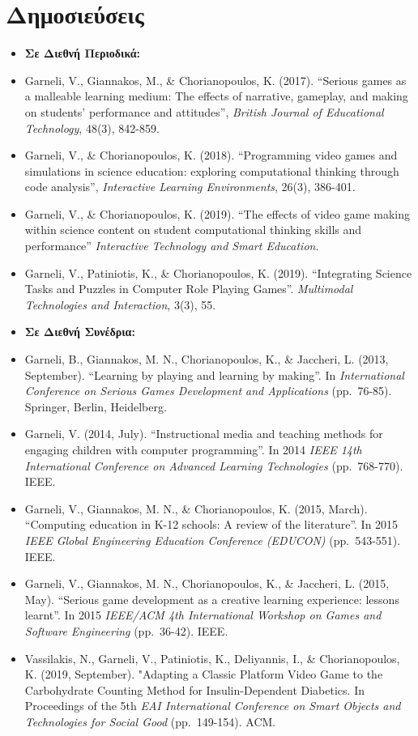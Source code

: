 \documentclass[%
    11pt,
  oneside
  ]{memoir}
\let\oldsection\section
\renewcommand{\section}[1]{%
  \oldsection{#1}
  \leavevmode
  \par
  \vspace{\dimexpr-\baselineskip-\parskip}
}
\begin{document}
\hypertarget{ux3b4ux3b7ux3bcux3bfux3c3ux3b9ux3b5ux3cdux3c3ux3b5ux3b9ux3c2}{%
\section{Δημοσιεύσεις}\label{ux3b4ux3b7ux3bcux3bfux3c3ux3b9ux3b5ux3cdux3c3ux3b5ux3b9ux3c2}}

\begin{itemize}
\tightlist
\item
  \textbf{Σε Διεθνή Περιοδικά:}
\item
  Garneli, V., Giannakos, M., \& Chorianopoulos, K. (2017). ``Serious
  games as a malleable learning medium: The effects of narrative,
  gameplay, and making on students' performance and attitudes'',
  \emph{British Journal of Educational Technology}, 48(3), 842-859.
\item
  Garneli, V., \& Chorianopoulos, K. (2018). ``Programming video games
  and simulations in science education: exploring computational thinking
  through code analysis'', \emph{Interactive Learning Environments},
  26(3), 386-401.
\item
  Garneli, V., \& Chorianopoulos, K. (2019). ``The effects of video game
  making within science content on student computational thinking skills
  and performance'' \emph{Interactive Technology and Smart Education}.
\item
  Garneli, V., Patiniotis, K., \& Chorianopoulos, K. (2019).
  ``Integrating Science Tasks and Puzzles in Computer Role Playing
  Games''. \emph{Multimodal Technologies and Interaction}, 3(3), 55.
\item
  \textbf{Σε Διεθνή Συνέδρια:}
\item
  Garneli, B., Giannakos, M. N., Chorianopoulos, K., \& Jaccheri, L.
  (2013, September). ``Learning by playing and learning by making''. In
  \emph{International Conference on Serious Games Development and
  Applications} (pp.~76-85). Springer, Berlin, Heidelberg.
\item
  Garneli, V. (2014, July). ``Instructional media and teaching methods
  for engaging children with computer programming''. In 2014 \emph{IEEE
  14th International Conference on Advanced Learning Technologies}
  (pp.~768-770). IEEE.
\item
  Garneli, V., Giannakos, M. N., \& Chorianopoulos, K. (2015, March).
  ``Computing education in K-12 schools: A review of the literature''.
  In 2015 \emph{IEEE Global Engineering Education Conference (EDUCON)}
  (pp.~543-551). IEEE.
\item
  Garneli, V., Giannakos, M. N., Chorianopoulos, K., \& Jaccheri, L.
  (2015, May). ``Serious game development as a creative learning
  experience: lessons learnt''. In 2015 \emph{IEEE/ACM 4th International
  Workshop on Games and Software Engineering} (pp.~36-42). IEEE.
\item
  Vassilakis, N., Garneli, V., Patiniotis, K., Deliyannis, I., \&
  Chorianopoulos, K. (2019, September). "Adapting a Classic Platform
  Video Game to the Carbohydrate Counting Method for Insulin-Dependent
  Diabetics. In Proceedings of the 5th \emph{EAI International
  Conference on Smart Objects and Technologies for Social Good}
  (pp.~149-154). ACM.
\end{itemize}
\end{document}
